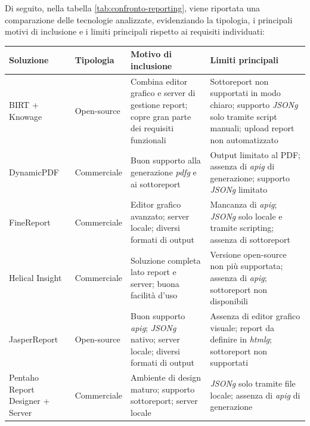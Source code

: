     Di seguito, nella tabella \ref{tab:confronto-reporting}, viene riportata una comparazione delle tecnologie analizzate, evidenziando la tipologia, i principali motivi di inclusione e i limiti principali rispetto ai requisiti individuati:
    \begin{table}[H]%
    \centering
    \renewcommand{\arraystretch}{1.3}
    \begin{tabularx}{\textwidth}{|>{\raggedright\arraybackslash}X
                                |>{\raggedright\arraybackslash}X
                                |>{\raggedright\arraybackslash}X
                                |>{\raggedright\arraybackslash}X|}
    \hline
        \rowcolor{gray!40}
        \textbf{Soluzione} & \textbf{Tipologia} & \textbf{Motivo di inclusione} & \textbf{Limiti principali} \\
    \hline
        BIRT + Knowage &
        Open-source &
        Combina editor grafico e server di gestione report; copre gran parte dei requisiti funzionali &
        Sottoreport non supportati in modo chiaro; supporto \emph{\gls{JSONg}} solo tramite script manuali; upload report non automatizzato \\
    \hline
        DynamicPDF &
        Commerciale &
        Buon supporto alla generazione \emph{\gls{pdfg}} e ai sottoreport &
        Output limitato al PDF; assenza di \emph{\gls{apig}} di generazione; supporto \emph{\gls{JSONg}} limitato \\
    \hline
        FineReport &
        Commerciale &
        Editor grafico avanzato; server locale; diversi formati di output &
        Mancanza di \emph{\gls{apig}}; \emph{\gls{JSONg}} solo locale e tramite scripting; assenza di sottoreport \\
    \hline
        Helical Insight &
        Commerciale &
        Soluzione completa lato report e server; buona facilità d'uso &
        Versione open-source non più supportata; assenza di \emph{\gls{apig}}; sottoreport non disponibili \\
    \hline
        JasperReport &
        Open-source &
        Buon supporto \emph{\gls{apig}}; \emph{\gls{JSONg}} nativo; server locale; diversi formati di output &
        Assenza di editor grafico visuale; report da definire in \emph{\gls{htmlg}}; sottoreport non supportati \\
    \hline
        Pentaho Report Designer + Server &
        Commerciale &
        Ambiente di design maturo; supporto sottoreport; server locale &
        \emph{\gls{JSONg}} solo tramite file locale; assenza di \emph{\gls{apig}} di generazione \\

\end{tabularx}
\end{table}
